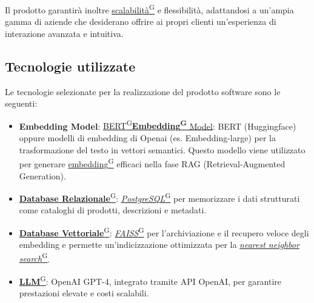 Il prodotto garantirà inoltre \href{https://code7crusaders.github.io/docs/RTB/documentazione_interna/glossario.html#scalabilità}{scalabilità\textsuperscript{G}} e flessibilità, adattandosi a un’ampia gamma di aziende che desiderano offrire ai propri clienti un’esperienza di interazione avanzata e intuitiva.


\subsection{Tecnologie utilizzate}
Le tecnologie selezionate per la realizzazione del prodotto software sono le seguenti:

\begin{itemize}

    \item \textbf{Embedding Model}: \href{https://code7crusaders.github.io/docs/RTB/documentazione_interna/glossario.html#bert-bidirectional-encoder-representations-from-transformers}{BERT\textsuperscript{G}}\href{https://code7crusaders.github.io/docs/RTB/documentazione_interna/glossario.html#embedding}{\textbf{Embedding\textsuperscript{G}} Model}: BERT (Huggingface) oppure modelli di embedding di Openai (es. Embedding-large) per la trasformazione del testo in vettori semantici. Questo modello viene utilizzato per generare \href{https://code7crusaders.github.io/docs/RTB/documentazione_interna/glossario.html#embedding}{embedding\textsuperscript{G}} efficaci nella fase RAG (Retrieval-Augmented Generation).
    \item \href{https://code7crusaders.github.io/docs/RTB/documentazione_interna/glossario.html#database-relazionale}{\textbf{Database Relazionale}\textsuperscript{G}}: \href{https://code7crusaders.github.io/docs/RTB/documentazione_interna/glossario.html#postgresql}{\textit{PostgreSQL}\textsuperscript{G}} per memorizzare i dati strutturati come cataloghi di prodotti, descrizioni e metadati.
    \item \href{https://code7crusaders.github.io/docs/RTB/documentazione_interna/glossario.html#database-vettoriale}{\textbf{Database Vettoriale}\textsuperscript{G}}: \href{https://code7crusaders.github.io/docs/RTB/documentazione_interna/glossario.html#faiss}{\textit{FAISS}\textsuperscript{G}} per l'archiviazione e il recupero veloce degli embedding e permette un'indicizzazione ottimizzata per la \href{https://code7crusaders.github.io/docs/RTB/documentazione_interna/glossario.html#nearest-neighbor-search-nns}{\textit{nearest neighbor search}\textsuperscript{G}}.
    \item \href{https://code7crusaders.github.io/docs/RTB/documentazione_interna/glossario.html#llm-large-language-model}{\textbf{LLM}\textsuperscript{G}}: OpenAI GPT-4, integrato tramite API OpenAI, per garantire prestazioni elevate e costi scalabili.

\end{itemize}
